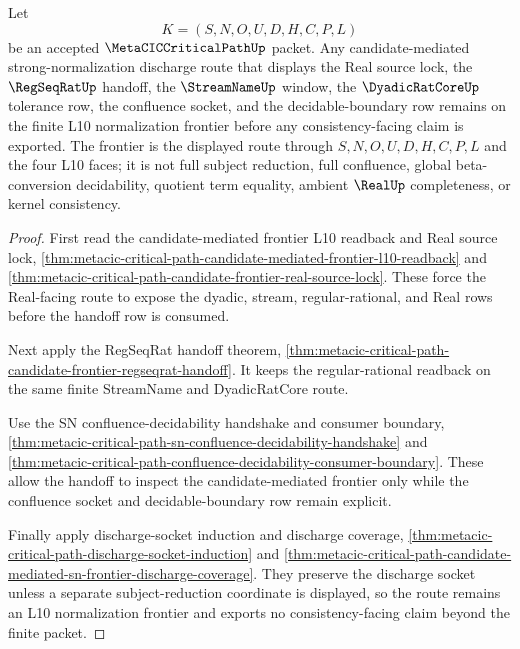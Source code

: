 \begin{theorem}
\label{thm:metacic-criticalpath-l10-normalization-frontier}
Let
$$
K=(S,N,O,U,D,H,C,P,L)
$$
be an accepted $\MetaCICCriticalPathUp$ packet. Any candidate-mediated strong-normalization discharge route that displays the Real source lock, the $\RegSeqRatUp$ handoff, the $\StreamNameUp$ window, the $\DyadicRatCoreUp$ tolerance row, the confluence socket, and the decidable-boundary row remains on the finite L10 normalization frontier before any consistency-facing claim is exported. The frontier is the displayed route through $S,N,O,U,D,H,C,P,L$ and the four L10 faces; it is not full subject reduction, full confluence, global beta-conversion decidability, quotient term equality, ambient $\RealUp$ completeness, or kernel consistency.
\end{theorem}
\begin{proof}
First read the candidate-mediated frontier L10 readback and Real source lock, \autoref{thm:metacic-critical-path-candidate-mediated-frontier-l10-readback} and \autoref{thm:metacic-critical-path-candidate-frontier-real-source-lock}. These force the Real-facing route to expose the dyadic, stream, regular-rational, and Real rows before the handoff row is consumed.

Next apply the RegSeqRat handoff theorem, \autoref{thm:metacic-critical-path-candidate-frontier-regseqrat-handoff}. It keeps the regular-rational readback on the same finite StreamName and DyadicRatCore route.

Use the SN confluence-decidability handshake and consumer boundary, \autoref{thm:metacic-critical-path-sn-confluence-decidability-handshake} and \autoref{thm:metacic-critical-path-confluence-decidability-consumer-boundary}. These allow the handoff to inspect the candidate-mediated frontier only while the confluence socket and decidable-boundary row remain explicit.

Finally apply discharge-socket induction and discharge coverage, \autoref{thm:metacic-critical-path-discharge-socket-induction} and \autoref{thm:metacic-critical-path-candidate-mediated-sn-frontier-discharge-coverage}. They preserve the discharge socket unless a separate subject-reduction coordinate is displayed, so the route remains an L10 normalization frontier and exports no consistency-facing claim beyond the finite packet.
\end{proof}

